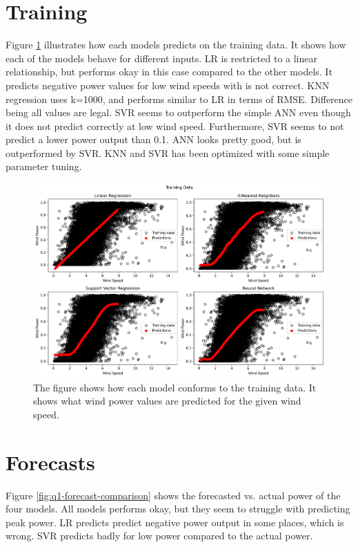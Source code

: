 \documentclass[a4paper, article, oneside, USenglish, IN5460]{memoir}
\begin{document}
\section{Training}
Figure \ref{fig:q1-training-data} illustrates how each models predicts on the training data. It shows how each of the models behave for different inputs. LR is restricted to a linear relationship, but performs okay in this case compared to the other models. It predicts negative power values for low wind speeds with is not correct. KNN regression uses k=1000, and performs similar to LR in terms of RMSE. Difference being all values are legal. SVR seems to outperform the simple ANN even though it does not predict correctly at low wind speed. Furthermore, SVR seems to not predict a lower power output than 0.1. ANN looks pretty good, but is outperformed by SVR. KNN and SVR has been optimized with some simple parameter tuning.
\begin{figure}[H]
    \centering
    \includegraphics[width=1\linewidth]{fig/q1-ALL-training.png}
    \caption{The figure shows how each model conforms to the training data. It shows what wind power values are predicted for the given wind speed.}
    \label{fig:q1-training-data}
\end{figure}

\section{Forecasts}
Figure \ref{fig:q1-forecast-comparison}  shows the forecasted vs. actual power of the four models. All models performs okay, but they seem to struggle with predicting peak power. LR predicts predict negative power output in some places, which is wrong. SVR predicts badly for low power compared to the actual power. 
\end{document}
